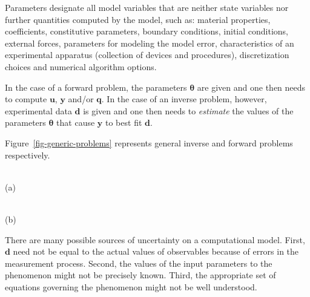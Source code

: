 Parameters designate all model variables that are neither state variables
nor further quantities computed by the model, such as: material properties, coefficients, constitutive parameters, boundary conditions, initial conditions,
external forces, parameters for modeling the model error, characteristics of an experimental apparatus (collection of devices and procedures),
discretization choices and numerical algorithm options.



In the case of a forward problem, the parameters $\boldsymbol{\theta}$ are given and
one then needs to compute $\mathbf{u}$, $\mathbf{y}$ and/or $\mathbf{q}$.
In the case of an inverse problem, however, experimental data $\mathbf{d}$ is given and
one then needs to {\it estimate} the values of the parameters $\boldsymbol{\theta}$ that
cause $\mathbf{y}$ to best fit  $\mathbf{d}$.


Figure~\ref{fig-generic-problems} represents general inverse and forward problems respectively.
%
\begin{figure*}[htb]
\begin{minipage}[b]{0.5\textwidth}
\\
\centering
(a)
\end{minipage}%
\begin{minipage}[b]{0.5\textwidth}
\\
\centering 
(b)
\end{minipage}
\vspace{-20pt}
\caption{The representation of (a) a generic forward problem and (b) a generic inverse problem.}
\label{fig-generic-problems}
\end{figure*}


There are many possible sources of uncertainty on a computational model. %
First, $\mathbf{d}$ need not be equal to the actual values of observables because of errors in the measurement process. Second, the values of the input parameters to the phenomenon might not be precisely known. Third, the appropriate set of
equations governing the phenomenon might not be well understood. 

